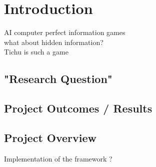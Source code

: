 \chapter{Introduction}
AI computer perfect information games \\
what about hidden information? \\
Tichu is such a game \\

\section{"Research Question"}


\section{Project Outcomes / Results}


\section{Project Overview}
Implementation of the framework ?\\
